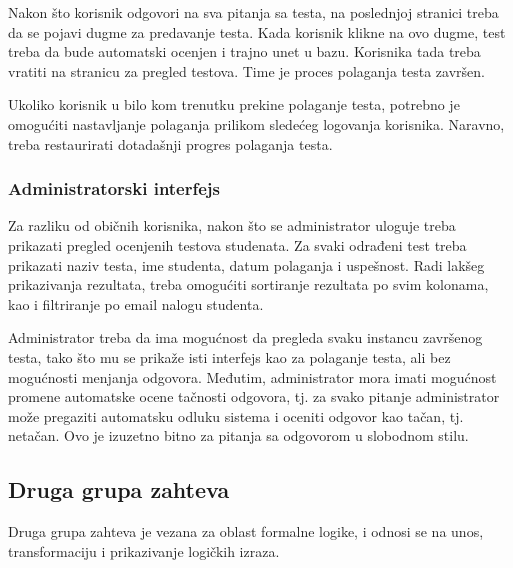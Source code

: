Nakon što korisnik odgovori na sva pitanja sa testa, na poslednjoj stranici treba da se pojavi dugme za predavanje testa. Kada korisnik klikne na ovo dugme, test treba da bude automatski ocenjen i trajno unet u bazu. Korisnika tada treba vratiti na stranicu za pregled testova. Time je proces polaganja testa završen.

Ukoliko korisnik u bilo kom trenutku prekine polaganje testa, potrebno je omogućiti nastavljanje polaganja prilikom sledećeg logovanja korisnika. Naravno, treba restaurirati dotadašnji progres polaganja testa.

\subsubsection{Administratorski interfejs}
Za razliku od običnih korisnika, nakon što se administrator uloguje treba prikazati pregled ocenjenih testova studenata. Za svaki odrađeni test treba prikazati naziv testa, ime studenta, datum polaganja i uspešnost. Radi lakšeg prikazivanja rezultata, treba omogućiti sortiranje rezultata po svim kolonama, kao i filtriranje po email nalogu studenta.


Administrator treba da ima mogućnost da pregleda svaku instancu završenog testa, tako što mu se prikaže isti interfejs kao za polaganje testa, ali bez mogućnosti menjanja odgovora. Međutim, administrator mora imati mogućnost promene automatske ocene tačnosti odgovora, tj. za svako pitanje administrator može pregaziti automatsku odluku sistema i oceniti odgovor kao tačan, tj. netačan. Ovo je izuzetno bitno za pitanja sa odgovorom u slobodnom stilu.

\subsection{Druga grupa zahteva}
Druga grupa zahteva je vezana za oblast formalne logike, i odnosi se na unos, transformaciju i prikazivanje logičkih izraza.

